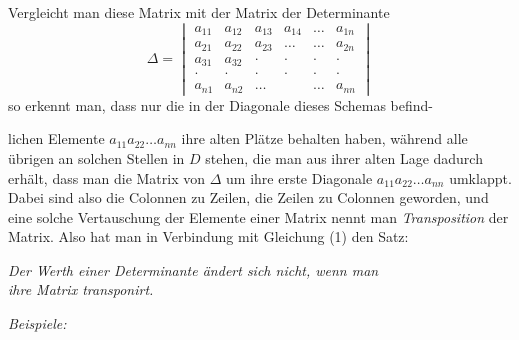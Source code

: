 \documentclass[11pt]{article}
\providecommand{\weberpage}[1]{}
\let\Delta\varDelta
\begin{document}
Vergleicht man diese Matrix mit der Matrix der Determinante
\[
\Delta = \begin{vmatrix}
a_{11} & a_{12} & a_{13} & a_{14} & \ldots & a_{1n}\\
a_{21} & a_{22} & a_{23} & \ldots & \ldots & a_{2n}\\
a_{31} & a_{32} & \cdot & \cdot & \cdot & \cdot\\
\cdot & \cdot & \cdot & \cdot & \cdot & \cdot\\
a_{n1} & a_{n2} & \ldots & & \ldots & a_{nn}
\end{vmatrix}
\]
so erkennt man, dass nur die in der Diagonale dieses Schemas befind-


\weberpage{23}
lichen Elemente $a_{11}a_{22}\ldots a_{nn}$ ihre alten Plätze behalten haben, während alle übrigen an solchen Stellen in $D$ stehen, die man aus ihrer alten Lage dadurch erhält, dass man die Matrix von $\Delta$ um ihre erste Diagonale $a_{11}a_{22}\ldots a_{nn}$ umklappt. Dabei sind also die Colonnen zu Zeilen, die Zeilen zu Colonnen geworden, und eine solche Vertauschung der Elemente einer Matrix nennt man \textit{Transposition} der Matrix. Also hat man in Verbindung mit Gleichung (1) den Satz:

\begin{center}
\textit{\glqq Der Werth einer Determinante ändert sich nicht, wenn man\\
ihre Matrix transponirt.\grqq{}}
\end{center}

\textit{Beispiele:}
\end{document}
